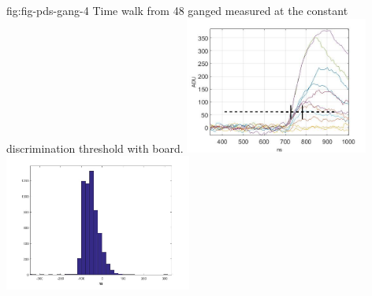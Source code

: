 \begin{dunefigure}
 {fig:fig-pds-gang-4}
 {Time walk from 48 ganged  measured at the constant discrimination threshold with  board.}
\includegraphics[height=4.5cm]{graphics/pds-gang-time_walk.jpg}
\includegraphics[height=4.5cm]{graphics/pds_gang_fig8.jpg}
\end{dunefigure}




